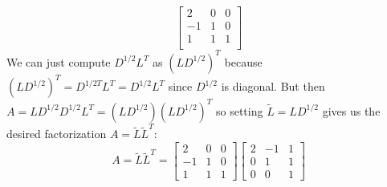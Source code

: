 \documentclass[11pt]{article}
\begin{document}
\begin{exercise}{4}
{$$        \begin{bmatrix}
            2 & 0 & 0 \\
            -1 & 1 & 0 \\
            1 & 1 & 1 \\
        \end{bmatrix}
        $$
        We can just compute $D^{1/2} L^T$ as $(L D^{1/2})^T$ because $(L D^{1/2})^T = D^{1/2T} L^T = D^{1/2} L^T $ since $D^{1/2}$ is diagonal.
        But then $A = L D^{1/2} D^{1/2} L^T = (L D^{1/2}) (L D^{1/2})^T$ so setting $\tilde{L} = L D^{1/2}$ gives us the desired factorization $A = \tilde{L} \tilde{L}^T$:
        $$ A = \tilde{L} \tilde{L}^T =
        \begin{bmatrix}
            2  & 0 & 0 \\
            -1 & 1 & 0 \\
            1  & 1 & 1
        \end{bmatrix}
        \begin{bmatrix}
            2 & -1 & 1 \\
            0 &  1 & 1 \\
            0 & 0 & 1
        \end{bmatrix}
        $$
    }
\end{exercise}
\end{document}
